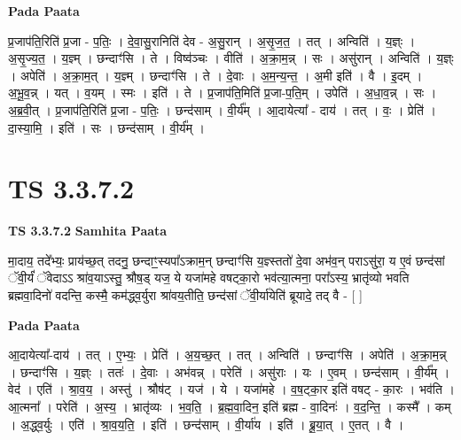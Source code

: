 \documentclass[17pt]{extarticle}
\begin{document}
\textbf{Pada Paata} \newline

प्र॒जाप॑ति॒रिति॑ प्र॒जा - प॒तिः॒ । दे॒वा॒सु॒रानिति॑ देव - अ॒सु॒रान् । अ॒सृ॒ज॒त॒ । तत् । अन्विति॑ । य॒ज्ञ्ः । अ॒सृ॒ज्य॒त॒ । य॒ज्ञ्म् । छन्दाꣳ॑सि । ते । विष्व॑ञ्चः । वीति॑ । अ॒क्रा॒म॒न्न् । सः । असु॑रान् । अन्विति॑ । य॒ज्ञ्ः । अपेति॑ । अ॒क्रा॒म॒त् । य॒ज्ञ्म् । छन्दाꣳ॑सि । ते । दे॒वाः । अ॒म॒न्य॒न्त॒ । अ॒मी इति॑ । वै । इ॒दम् । अ॒भू॒व॒न्न् । यत् । व॒यम् । स्मः । इति॑ । ते । प्र॒जाप॑ति॒मिति॑ प्र॒जा-प॒ति॒म् । उपेति॑ । अ॒धा॒व॒न्न् । सः । अ॒ब्र॒वी॒त् । प्र॒जाप॑ति॒रिति॑ प्र॒जा - प॒तिः॒ । छन्द॑साम् । वी॒र्य᳚म् । आ॒दायेत्या᳚ - दाय॑ । तत् । वः॒ । प्रेति॑ । दा॒स्या॒मि॒ । इति॑ । सः । छन्द॑साम् । वी॒र्य᳚म् ।  \newline




\section*{ TS 3.3.7.2 }

\textbf{TS 3.3.7.2 } \newline
\textbf{Samhita Paata} \newline

मा॒दाय॒ तदे᳚भ्यः॒ प्राय॑च्छ॒त् तदनु॒ छन्दाꣳ॒॒स्यपा᳚ऽक्राम॒न् छन्दाꣳ॑सि य॒ज्ञ्स्ततो॑ दे॒वा अभ॑व॒न् पराऽसु॑रा॒ य ए॒वं छन्द॑सां ॅवी॒र्यं॑ ॅवेदाऽऽ श्रा॑व॒याऽस्तु॒ श्रौष॒ड् यज॒ ये यजा॑महे वषट्का॒रो भव॑त्या॒त्मना॒ परा᳚ऽस्य॒ भ्रातृ॑व्यो भवति ब्रह्मवा॒दिनो॑ वदन्ति॒ कस्मै॒ कम॑द्ध्व॒र्युरा श्रा॑वय॒तीति॒ छन्द॑सां ॅवी॒र्या॑येति॑ ब्रूयादे॒ तद् वै - [  ] \newline

\textbf{Pada Paata} \newline

आ॒दायेत्या᳚-दाय॑ । तत् । ए॒भ्यः॒ । प्रेति॑ । अ॒य॒च्छ॒त् । तत् । अन्विति॑ । छन्दाꣳ॑सि । अपेति॑ । अ॒क्रा॒म॒न्न् । छन्दाꣳ॑सि । य॒ज्ञ्ः । ततः॑ । दे॒वाः । अभ॑वन्न् । परेति॑ । असु॑राः । यः । ए॒वम् । छन्द॑साम् । वी॒र्य᳚म् । वेद॑ । एति॑ । श्रा॒व॒य॒ । अस्तु॑ । श्रौष॑ट् । यज॑ । ये । यजा॑महे । व॒ष॒ट्का॒र इति॑ वषट् - का॒रः । भव॑ति । आ॒त्मना᳚ । परेति॑ । अ॒स्य॒ । भ्रातृ॑व्यः । भ॒व॒ति॒ । ब्र॒ह्म॒वा॒दिन॒ इति॑ ब्रह्म - वा॒दिनः॑ । व॒द॒न्ति॒ । कस्मै᳚ । कम् । अ॒द्ध्व॒र्युः । एति॑ । श्रा॒व॒य॒ति॒ । इति॑ । छन्द॑साम् । वी॒र्या॑य । इति॑ । ब्रू॒या॒त् । ए॒तत् । वै ।  \newline




\end{document}
